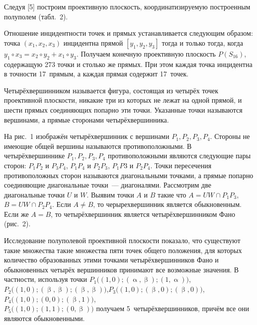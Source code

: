 

Следуя [5] построим проективную плоскость, координатизируемую построенным полуполем (табл.~2).



Отношение инцидентности точек и прямых устанавливается следующим образом: точка $(x_1,x_2,x_3)$ инцидентна прямой $[y_1,y_2,y_3]$ тогда и только тогда, когда $y_1 \circ x_3 = x_2 \circ y_2 + x_1 \circ y_3$. Получаем конечную проективную плоскость $P(S_{16})$, содержащую 273 точки и столько же прямых. При этом каждая точка инцидентна в точности 17~прямым, а каждая прямая содержит 17~точек.



Четырёхвершинником называется  фигура, состоящая из четырёх точек проективной плоскости, никакие три из которых не лежат на одной прямой, и шести прямых соединяющих попарно эти точки. Указанные точки называются вершинами, а прямые сторонами четырёхвершинника.

На рис.~1 изображён четырёхвершинник с вершинами $P_1, P_2, P_3, P_4$. Стороны не имеющие общей вершины называются противоположными. В четырёхвершиннике $P_1, P_2, P_3, P_4$ противоположными являются следующие пары сторон: $P_1P_2$ и $P_3P_4$, $P_1P_4$ и $P_2P_3$, $P_1P3$ и $P_2P_4$. Точки пересечения противоположных сторон называются диагональными точками, а прямые попарно соединяющие диагональные точки~--- диагоналями. Рассмотрим две диагональные точки $U$ и $W$. Выявим точки $A$ и $B$ такие что $A = UW \cap P_1P_3$, $B = UW \cap P_2P_4$. Если $A \neq B$, то черырехвершинник является обыкновенным. Если же $A = B$, то четырёхвершинник является четырёхвершинником Фано (рис.~2).

\vspace{-8pt}





Исследование полуполевой проективной плоскости  показало, что существуют такие множества такие множества пяти точек общего положения, для которых количество образованных этими точками четырёхвершинников Фано и обыкновенных четырёх вершинников принимают все возможные значения. В частности, используя точки $P_1 \bigl((1,0);(\upalpha,\upbeta);(1,\upalpha)\bigr)$, $P_2 \bigl((1,0);(\upbeta,\upbeta);(\upbeta,\upbeta)\bigr)$,\quad\quad $P_3 \bigl((1,0);(\upbeta,0);(\upbeta,0)\bigr)$,\quad\quad $P_4 \bigl((1,0);(0,0);(\upbeta,1)\bigr)$,\\ $P_5 \bigl((1,0);(1,1);(0,\upbeta)\bigr)$  получаем 5~четырёхвершинников, причём все они являются обыкновенными.

